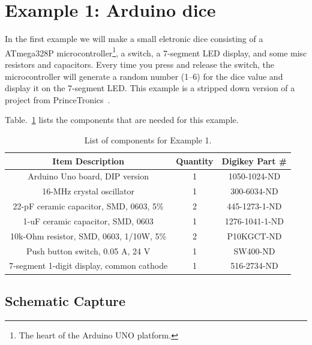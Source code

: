 \documentclass[12pt,letterpaper]{scrartcl}
\begin{document}
\newpage
\section{Example 1: Arduino dice}
In the first example we will make a small eletronic dice consisting of a ATmega328P microcontroller\footnote{The heart of the Arduino UNO platform.}, a switch, a 7-segment LED display, and some misc resistors and capacitors. Every time you press and release the switch, the microcontroller will generate a random number (1--6) for the dice value and display it on the 7-segment LED. This example is a stripped down version of a project from PrinceTronics~\cite{dice}. 

Table.~\ref{tab:example1} lists the components that are needed for this example.

\begin{table}[h]
\centering
\caption{List of components for Example 1.}
\begin{tabular}{|c|c|c|}
\hline \bf  Item Description & \bf Quantity & \bf Digikey Part \# \\ 
\hline \hline  Arduino Uno board, DIP version & 1 & 1050-1024-ND \\ 
\hline  16-MHz crystal oscillator &  1 & 300-6034-ND \\ 
\hline  22-pF ceramic capacitor, SMD, 0603, 5\% & 2 & 445-1273-1-ND  \\ 
\hline  1-uF ceramic capacitor, SMD, 0603 & 1 & 1276-1041-1-ND \\ 
\hline  10k-Ohm resistor, SMD, 0603, 1/10W, 5\% & 2 & P10KGCT-ND \\ 
\hline  Push button switch, 0.05 A, 24 V  & 1 & SW400-ND \\ 
\hline  7-segment 1-digit display, 
common cathode & 1 & 516-2734-ND \\ 
\hline 
\end{tabular} 
\label{tab:example1}
\end{table}

\subsection{Schematic Capture}
\end{document}
